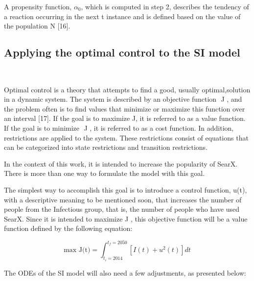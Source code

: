 \documentclass{article}
\begin{document}
A‌ ‌propensity‌ ‌function,‌ $\alpha_0$,‌ ‌which‌ ‌is‌ ‌computed‌ ‌in‌ ‌step‌ ‌2,‌ ‌describes‌ ‌the‌ ‌tendency‌ ‌of‌ ‌a‌ ‌reaction‌‌ occurring‌ ‌in‌ ‌the‌ ‌next‌ t ‌instance‌ ‌and‌ ‌is‌ ‌defined‌ ‌based‌ ‌on‌ ‌the‌ ‌value‌ ‌of‌ ‌the‌ ‌population‌ N [16‌].‌ 

\subsection{Applying‌ ‌the‌ ‌optimal‌ ‌control‌ ‌to‌ ‌the‌ ‌SI‌ ‌model}‌

Optimal‌ ‌control‌ ‌is‌ ‌a‌ ‌theory‌ ‌that‌‌ attempts‌‌ to‌‌ find‌‌ a‌‌ good,‌‌ usually‌‌ optimal,‌‌solution‌‌ in‌‌ a‌‌ dynamic‌‌ system.‌ ‌The‌ ‌system‌ ‌is‌ ‌described‌ ‌by‌ ‌an‌ ‌objective‌ ‌function‌ ‌ J ,‌ ‌and‌ ‌the‌‌ problem‌‌ often‌‌ is‌‌ to‌‌ find‌‌ values‌‌ that‌‌ minimize‌‌ or‌‌ maximize‌‌ this‌‌ function‌‌ over‌‌ an‌‌ interval‌‌ [17‌].‌‌ If‌‌ the‌‌ goal‌‌ is‌‌ to‌‌ maximize‌‌ J,‌‌ it‌ ‌is‌ ‌referred‌ ‌to‌ ‌as‌ ‌a‌ ‌value‌ ‌function.‌ ‌If‌ ‌the‌ ‌goal‌ ‌is‌ ‌to‌ ‌minimize‌ ‌ J ,‌ ‌it‌ ‌is‌ ‌referred‌ ‌to‌ ‌as‌ ‌a‌ ‌cost‌‌ function.‌ ‌In‌ ‌addition,‌ ‌restrictions‌ ‌are‌ ‌applied‌ ‌to‌ ‌the‌ ‌system.‌ ‌These‌ ‌restrictions‌ ‌consist‌ ‌of‌‌ equations‌ ‌that‌ ‌can‌ ‌be‌ ‌categorized‌ ‌into‌ ‌state‌ ‌restrictions‌ ‌and‌ ‌transition‌ ‌restrictions.

In‌ ‌the‌ ‌context‌ ‌of‌ ‌this‌ ‌work,‌ ‌it‌ ‌is‌ ‌intended‌ ‌to‌ ‌increase‌ ‌the‌ ‌popularity‌ ‌of‌ ‌SearX.‌ ‌There‌ ‌is‌ ‌more‌ ‌than‌‌ one‌ ‌way‌ ‌to‌ ‌formulate‌ ‌the‌ ‌model‌ ‌with‌ ‌this‌ ‌goal.‌‌ 

The‌ ‌simplest‌ ‌way‌ ‌to‌ ‌accomplish‌ ‌this‌ ‌goal‌ ‌is‌ ‌to‌ ‌introduce‌ ‌a‌ ‌control‌ ‌function,‌ ‌u(t),‌ ‌with‌ ‌a‌‌ descriptive‌ ‌meaning‌ ‌to‌ ‌be‌ ‌mentioned‌ ‌soon,‌ ‌that‌ ‌increases‌ ‌the‌ ‌number‌ ‌of‌ ‌people‌ ‌from‌ ‌the‌‌ Infectious‌ ‌group,‌ ‌that‌ ‌is,‌ ‌the‌ ‌number‌ ‌of‌ ‌people‌ ‌who‌ ‌have‌ ‌used‌ ‌SearX.‌ ‌Since‌ ‌it‌ ‌is‌‌ intended‌‌ to‌‌ maximize‌ J ,‌ ‌this‌ ‌objective‌ ‌function‌ ‌will‌ ‌be‌ ‌a‌ ‌value‌ ‌function‌ ‌defined‌ ‌by‌ ‌the‌ ‌following‌ ‌equation:‌ 

\begin{equation}
    \text{max J(t)} = \int_\text{$t_i=2014$}^\text{$t_f=2050$} [ I(t) + u^2(t) ] dt
\end{equation}

The‌ ‌ODEs‌ ‌of‌ ‌the‌ ‌SI‌ ‌model‌ ‌will‌ ‌also‌ ‌need‌ ‌a‌ ‌few‌ ‌adjustments,‌ ‌as‌ ‌presented‌ ‌below:‌‌

\end{document}

